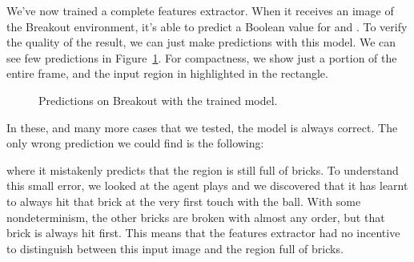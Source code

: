 We've now trained a complete features extractor. When it receives an image of
the Breakout environment, it's able to predict a Boolean value for
 and . To verify the quality of the result, we can
just make predictions with this model. We can see few predictions in
Figure~\ref{fig:breakout-predict}. For compactness, we show just a portion of
the entire frame, and the input region in highlighted in the rectangle.
\begin{figure}
	\centering
	\caption{Predictions on Breakout with the trained model.}
	\label{fig:breakout-predict}
\end{figure}

In these, and many more cases that we tested, the model is always correct. The
only wrong prediction we could find is the following:
\begin{center}
\end{center}
where it mistakenly predicts that the region is still full of bricks. To
understand this small error, we looked at the agent plays and we discovered
that it has learnt to always hit that brick at the very first touch with the
ball. With some nondeterminism, the other bricks are broken with almost any
order, but that brick is always hit first. This means that the features
extractor had no incentive to distinguish between this input image and the
region full of bricks.

